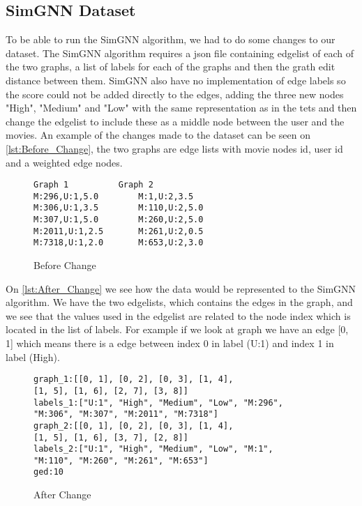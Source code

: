 \subsection{SimGNN Dataset}
To be able to run the SimGNN algorithm, we had to do some changes to our dataset. The SimGNN algorithm requires a json file containing edgelist of each of the two graphs, a list of labels for each of the graphs and then the grath edit distance between them. SimGNN also have no implementation of edge labels so the score could not be added directly to the edges, adding the three new nodes "High", "Medium" and "Low" with the same representation as in the tets and then change the edgelist to include these as a middle node between the user and the movies. 
An example of the changes made to the dataset can be seen on \autoref{lst:Before_Change}, the two graphs are edge lists with movie nodes id, user id and a weighted edge nodes. 
\begin{figure}
\begin{lstlisting}
Graph 1			 Graph 2
M:296,U:1,5.0		 M:1,U:2,3.5
M:306,U:1,3.5		 M:110,U:2,5.0
M:307,U:1,5.0		 M:260,U:2,5.0
M:2011,U:1,2.5 		 M:261,U:2,0.5
M:7318,U:1,2.0		 M:653,U:2,3.0
\end{lstlisting}
\caption{Before Change}
\label{lst:Before_Change}
\end{figure}
On \autoref{lst:After_Change} we see how the data would be represented to the SimGNN algorithm. We have the two edgelists, which contains the edges in the graph, and we see that the values used in the edgelist are related to the node index which is located in the list of labels. For example if we look at graph we have an edge [0, 1] which means there is a edge between index 0 in label (U:1) and index 1 in label (High).
\begin{figure}
\begin{lstlisting}
graph_1:[[0, 1], [0, 2], [0, 3], [1, 4], 
[1, 5], [1, 6], [2, 7], [3, 8]]
labels_1:["U:1", "High", "Medium", "Low", "M:296", 
"M:306", "M:307", "M:2011", "M:7318"]
graph_2:[[0, 1], [0, 2], [0, 3], [1, 4], 
[1, 5], [1, 6], [3, 7], [2, 8]]
labels_2:["U:1", "High", "Medium", "Low", "M:1",
"M:110", "M:260", "M:261", "M:653"]
ged:10
\end{lstlisting}
\caption{After Change}
\label{lst:After_Change}
\end{figure}
